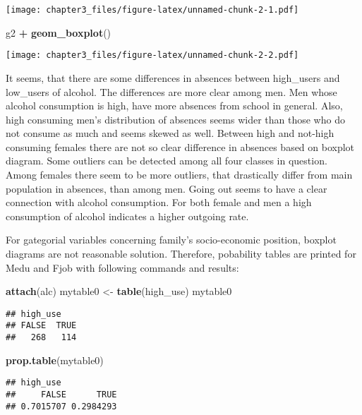 \documentclass[]{article}
\newenvironment{Shaded}{\begin{snugshade}}{\end{snugshade}}
\newcommand{\KeywordTok}[1]{\textcolor[rgb]{0.13,0.29,0.53}{\textbf{#1}}}
\newcommand{\NormalTok}[1]{#1}
\newcommand{\OperatorTok}[1]{\textcolor[rgb]{0.81,0.36,0.00}{\textbf{#1}}}
\newcommand{\StringTok}[1]{\textcolor[rgb]{0.31,0.60,0.02}{#1}}
\begin{document}
\texttt{[image: chapter3\_files/figure-latex/unnamed-chunk-2-1.pdf]}

\begin{Shaded}
\begin{Highlighting}[]
\NormalTok{g2 }\OperatorTok{+}\StringTok{ }\KeywordTok{geom_boxplot}\NormalTok{()}
\end{Highlighting}
\end{Shaded}

\texttt{[image: chapter3\_files/figure-latex/unnamed-chunk-2-2.pdf]}

It seems, that there are some differences in absences between
high\_users and low\_users of alcohol. The differences are more clear
among men. Men whose alcohol consumption is high, have more absences
from school in general. Also, high consuming men's distribution of
absences seems wider than those who do not consume as much and seems
skewed as well. Between high and not-high consuming females there are
not so clear difference in absences based on boxplot diagram. Some
outliers can be detected among all four classes in question. Among
females there seem to be more outliers, that drastically differ from
main population in absences, than among men. Going out seems to have a
clear connection with alcohol consumption. For both female and men a
high consumption of alcohol indicates a higher outgoing rate.

For gategorial variables concerning family's socio-economic position,
boxplot diagrams are not reasonable solution. Therefore, pobability
tables are printed for Medu and Fjob with following commands and
results:

\begin{Shaded}
\begin{Highlighting}[]
\KeywordTok{attach}\NormalTok{(alc)}
\NormalTok{mytable0 <-}\StringTok{ }\KeywordTok{table}\NormalTok{(high_use)}
\NormalTok{mytable0}
\end{Highlighting}
\end{Shaded}

\begin{verbatim}
## high_use
## FALSE  TRUE 
##   268   114
\end{verbatim}

\begin{Shaded}
\begin{Highlighting}[]
\KeywordTok{prop.table}\NormalTok{(mytable0)}
\end{Highlighting}
\end{Shaded}

\begin{verbatim}
## high_use
##     FALSE      TRUE 
## 0.7015707 0.2984293
\end{verbatim}
\end{document}

